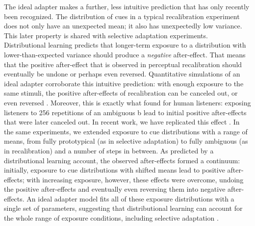 The ideal adapter makes a further, less intuitive prediction that has only recently been recognized. The distribution of cues in a typical recalibration experiment does not only have an unexpected mean; it also has unexpectedly low variance. This later property is shared with selective adaptation experiments. Distributional learning predicts that longer-term exposure to a distribution with lower-than-expected variance should produce a \emph{negative} after-effect. That means that the positive after-effect that is observed in perceptual recalibration should eventually be undone or perhaps even reversed. Quantitative simulations of an ideal adapter corroborate this intuitive prediction: with enough exposure to the same stimuli, the positive after-effects of recalibration can be canceled out, or even reversed \cite[pp. 164-6]{Kleinschmidt2015}.  Moreover, this is exactly what  found for human listeners: exposing listeners to 256 repetitions of an ambiguous \ph b lead to initial positive after-effects that were later canceled out.  In recent work, we have replicated this effect \cite{Kleinschmidt2012c}. In the same experiments, we extended exposure to cue distributions with a range of means, from fully prototypical (as in selective adaptation) to fully ambiguous (as in recalibration) and a number of steps in between.  As predicted by a distributional learning account, the observed after-effects formed a continuum: initially, exposure to cue distributions with shifted means lead to positive after-effects; with increasing exposure, however, these effects were overcome, undoing the positive after-effects and eventually even reversing them into negative after-effects. An ideal adapter model fits all of these exposure distributions with a single set of parameters, suggesting that distributional learning can account for the whole range of exposure conditions, including selective adaptation \cite{Kleinschmidt2015}.  

